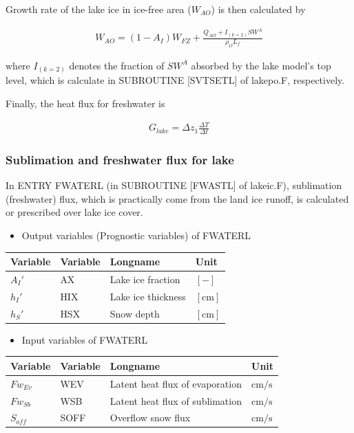 Growth rate of the lake ice in ice-free area (\(W_{AO}\)) is then calculated by

\begin{eqnarray}
    W_{AO} = (1-A_I)W_{FZ} + \frac{Q_{AO}+I_{(k=2)} SW^A}{\rho_O L_f}
\end{eqnarray}

where \(I_{(k=2)}\) denotes the fraction of \(SW^A\) absorbed by the lake model's top level, which is calculate in SUBROUTINE {[}SVTSETL{]} of lakepo.F, respectively.

Finally, the heat flux for freshwater is

\begin{eqnarray}
    G_{lake} = \Delta z_1 \frac{\Delta T }{\Delta t}
\end{eqnarray}

\hypertarget{sublimation-and-freshwater-flux-for-lake}{%
\subsubsection{Sublimation and freshwater flux for lake}\label{sublimation-and-freshwater-flux-for-lake}}

In ENTRY FWATERL (in SUBROUTINE {[}FWASTL{]} of lakeic.F), sublimation (freshwater) flux, which is practically come from the land ice runoff, is calculated or prescribed over lake ice cover.

\begin{itemize}
\tightlist
\item
  Output variables (Prognostic variables) of FWATERL
\end{itemize}

\begin{longtable}[]{@{}llll@{}}
\toprule
Variable & Variable & Longname & Unit \\
\midrule
\endhead
\(A_I'\) & AX & Lake ice fraction & \(\mathrm{[-]}\) \\
\(h_I'\) & HIX & Lake ice thickness & \(\mathrm{[cm]}\) \\
\(h_S'\) & HSX & Snow depth & \(\mathrm{[cm]}\) \\
\bottomrule
\end{longtable}

\begin{itemize}
\tightlist
\item
  Input variables of FWATERL
\end{itemize}

\begin{longtable}[]{@{}llll@{}}
\toprule
Variable & Variable & Longname & Unit \\
\midrule
\endhead
\(Fw_{Ev}\) & WEV & Latent heat flux of evaporation & \(\mathrm{cm/s}\) \\
\(Fw_{Sb}\) & WSB & Latent heat flux of sublimation & \(\mathrm{cm/s}\) \\
\(S_{off}\) & SOFF & Overflow snow flux & \(\mathrm{cm/s}\) \\
\bottomrule
\end{longtable}

